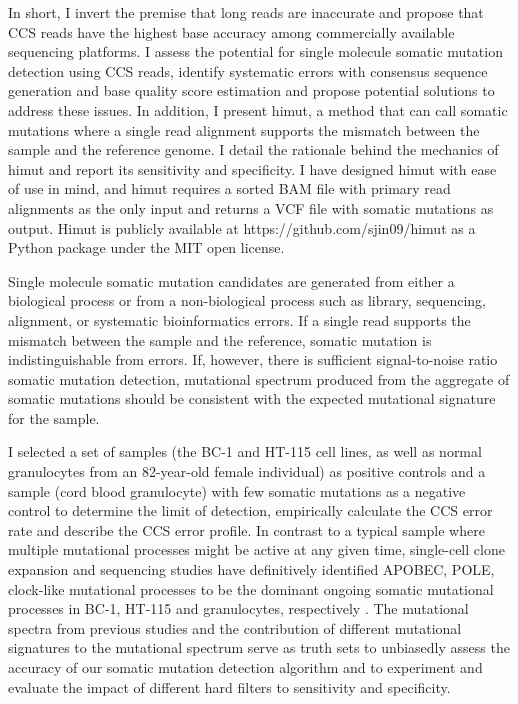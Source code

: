 In short, I invert the premise that long reads are inaccurate and propose that CCS reads have the highest base accuracy among commercially available sequencing platforms. I assess the potential for single molecule somatic mutation detection using CCS reads, identify systematic errors with consensus sequence generation and base quality score estimation and propose potential solutions to address these issues. In addition, I present himut, a method that can call somatic mutations where a single read alignment supports the mismatch between the sample and the reference genome. I detail the rationale behind the mechanics of himut and report its sensitivity and specificity. I have designed himut with ease of use in mind, and himut requires a sorted BAM file with primary read alignments as the only input and returns a VCF file with somatic mutations as output. Himut is publicly available at https://github.com/sjin09/himut as a Python package under the MIT open license.

Single molecule somatic mutation candidates are generated from either a biological process or from a non-biological process such as library, sequencing, alignment, or systematic bioinformatics errors. If a single read supports the mismatch between the sample and the reference, somatic mutation is indistinguishable from errors. If, however, there is sufficient signal-to-noise ratio somatic mutation detection, mutational spectrum produced from the aggregate of somatic mutations should be consistent with the expected mutational signature for the sample. 

I selected a set of samples (the BC-1 and HT-115 cell lines, as well as normal granulocytes from an 82-year-old female individual) as positive controls and a sample (cord blood granulocyte) with few somatic mutations as a negative control to determine the limit of detection, empirically calculate the CCS error rate and describe the CCS error profile. In contrast to a typical sample where multiple mutational processes might be active at any given time, single-cell clone expansion and sequencing studies have definitively identified APOBEC, POLE, clock-like mutational processes to be the dominant ongoing somatic mutational processes in BC-1, HT-115 and granulocytes, respectively \cite{Petljak2019-wi, Mitchell2022-ry}. The mutational spectra from previous studies and the contribution of different mutational signatures to the mutational spectrum serve as truth sets to unbiasedly assess the accuracy of our somatic mutation detection algorithm and to experiment and evaluate the impact of different hard filters to sensitivity and specificity.

